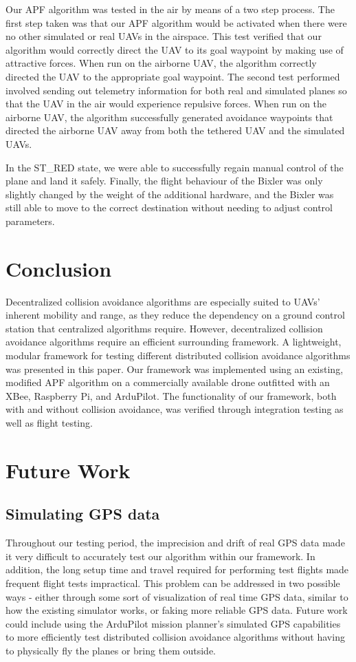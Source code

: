 \documentclass[conference]{IEEEtran}
\begin{document}
Our APF algorithm was tested in the air by means of a two step process.  The first step taken was that our APF algorithm would be activated when there were no other simulated or real UAVs in the airspace.  This test verified that our algorithm would correctly direct the UAV to its goal waypoint by making use of attractive forces.  When run on the airborne UAV, the algorithm correctly directed the UAV to the appropriate goal waypoint.  The second test performed involved sending out telemetry information for both real and simulated planes so that the UAV in the air would experience repulsive forces.  When run on the airborne UAV, the algorithm successfully generated avoidance waypoints that directed the airborne UAV away from both the tethered UAV and the simulated UAVs. 

In the ST\_RED state, we were able to successfully regain manual control of the plane and land it safely. Finally, the flight behaviour of the Bixler was only slightly changed by the weight of the additional hardware, and the Bixler was still able to move to the correct destination without needing to adjust control parameters.

\section{Conclusion}
\label{sec:conclusion}

Decentralized collision avoidance algorithms are especially suited to UAVs' inherent mobility and range, as they reduce the dependency on a ground control station that centralized algorithms require. However, decentralized collision avoidance algorithms require an efficient surrounding framework. A lightweight, modular framework for testing different distributed collision avoidance algorithms was presented in this paper. Our framework was implemented using an existing, modified APF algorithm on a commercially available drone outfitted with an XBee, Raspberry Pi, and ArduPilot. The functionality of our framework, both with and without collision avoidance, was verified through integration testing as well as flight testing.

\section{Future Work}
\label{sec:future work}
\subsection{Simulating GPS data}
Throughout our testing period, the imprecision and drift of real GPS data made it very difficult to accurately test our algorithm within our framework. In addition, the long setup time and travel required for performing test flights made frequent flight tests impractical. This problem can be addressed in two possible ways - either through some sort of visualization of real time GPS data, similar to how the existing simulator works, or faking more reliable GPS data. Future work could include using the ArduPilot mission planner's simulated GPS capabilities to more efficiently test distributed collision avoidance algorithms without having to physically fly the planes or bring them outside. 
\end{document}
